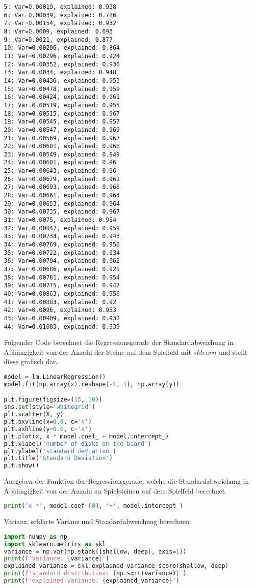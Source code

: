 \begin{lstlisting}
5: Var=0.00019, explained: 0.938
6: Var=0.00039, explained: 0.786
7: Var=0.00154, explained: 0.932
8: Var=0.0009, explained: 0.693
9: Var=0.0021, explained: 0.877
10: Var=0.00206, explained: 0.864
11: Var=0.00296, explained: 0.924
12: Var=0.00352, explained: 0.936
13: Var=0.0034, explained: 0.948
14: Var=0.00436, explained: 0.953
15: Var=0.00478, explained: 0.959
16: Var=0.00424, explained: 0.961
17: Var=0.00519, explained: 0.955
18: Var=0.00515, explained: 0.967
19: Var=0.00545, explained: 0.957
20: Var=0.00547, explained: 0.969
21: Var=0.00569, explained: 0.967
22: Var=0.00601, explained: 0.968
23: Var=0.00549, explained: 0.949
24: Var=0.00601, explained: 0.96
25: Var=0.00643, explained: 0.96
26: Var=0.00679, explained: 0.961
27: Var=0.00693, explained: 0.968
28: Var=0.00661, explained: 0.964
29: Var=0.00653, explained: 0.964
30: Var=0.00735, explained: 0.967
31: Var=0.0075, explained: 0.954
32: Var=0.00847, explained: 0.959
33: Var=0.00733, explained: 0.943
34: Var=0.00769, explained: 0.956
35: Var=0.00722, explained: 0.934
36: Var=0.00794, explained: 0.962
37: Var=0.00686, explained: 0.921
38: Var=0.00781, explained: 0.954
39: Var=0.00775, explained: 0.947
40: Var=0.00863, explained: 0.956
41: Var=0.00883, explained: 0.92
42: Var=0.0096, explained: 0.953
43: Var=0.00909, explained: 0.932
44: Var=0.01003, explained: 0.939
\end{lstlisting}

Folgender Code berechnet die Regressionsgerade der Standardabweichung in
Abhängigkeit von der Anzahl der Steine auf dem Spielfeld mit \(sklearn\)
und stellt diese grafisch dar.

\begin{lstlisting}[language=Python]
model = lm.LinearRegression()
model.fit(np.array(x).reshape(-1, 1), np.array(y))

plt.figure(figsize=(15, 10))
sns.set(style='whitegrid')
plt.scatter(X, y)
plt.axvline(x=0.0, c='k')
plt.axhline(y=0.0, c='k')
plt.plot(x, x * model.coef_ + model.intercept_)
plt.xlabel('number of disks on the board')
plt.ylabel('standard deviation')
plt.title('Standard Deviation')
plt.show()
\end{lstlisting}

Ausgeben der Funktion der Regressionsgerade, welche die
Standardabweichung in Abhängigkeit von der Anzahl an Spielsteinen auf
dem Spielfeld berechnet

\begin{lstlisting}[language=Python]
print('x *', model.coef_[0], '+', model.intercept_)
\end{lstlisting}

Varianz, erklärte Varianz und Standardabweichung berechnen

\begin{lstlisting}[language=Python]
import numpy as np
import sklearn.metrics as skl
variance = np.var(np.stack([shallow, deep], axis=1))
print(f'variance: {variance}')
explained_variance = skl.explained_variance_score(shallow, deep)
print(f'standard distribution: {np.sqrt(variance)}')
print(f'explained variance: {explained_variance}')
\end{lstlisting}
